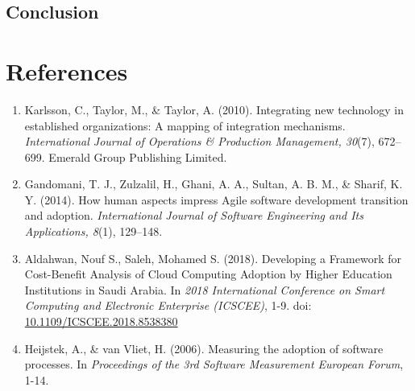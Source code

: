 \documentclass{article}
\begin{document}
\subsection{Conclusion}
\lipsum[28]

\section{References}
\begin{enumerate}
    \item Karlsson, C., Taylor, M., \& Taylor, A. (2010). Integrating new technology in established organizations: A mapping of integration mechanisms. \textit{International Journal of Operations \& Production Management, 30}(7), 672--699. Emerald Group Publishing Limited.
  
    \item Gandomani, T. J., Zulzalil, H., Ghani, A. A., Sultan, A. B. M., \& Sharif, K. Y. (2014). How human aspects impress Agile software development transition and adoption. \textit{International Journal of Software Engineering and Its Applications, 8}(1), 129--148.

    \item Aldahwan, Nouf S., Saleh, Mohamed S. (2018). Developing a Framework for Cost-Benefit Analysis of Cloud Computing Adoption by Higher Education Institutions in Saudi Arabia. In \textit{2018 International Conference on Smart Computing and Electronic Enterprise (ICSCEE)}, 1-9. doi: \url{10.1109/ICSCEE.2018.8538380}

    \item Heijstek, A., \& van Vliet, H. (2006). Measuring the adoption of software processes. In \textit{Proceedings of the 3rd Software Measurement European Forum}, 1-14. 



\end{enumerate}
\end{document}
